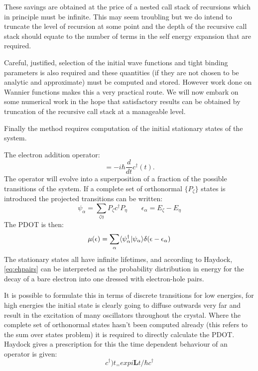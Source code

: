 These savings are obtained at the price of a nested call stack of recursions which 
in principle must be infinite. This may seem troubling but we do intend to truncate
the level of recursion at some point and the depth of the recursive call stack should
equate to the number of terms in the self energy expansion that are required.

	Careful, justified, selection of the initial wave functions and tight binding parameters
is also required and these quantities (if they are not chosen to be analytic and approximate)
must be computed and stored. However work done on Wannier functions makes this a very
practical route. We will now embark on some numerical work in the hope that satisfactory 
results can be obtained by truncation of the recursive call stack at a manageable level. 

Finally the method requires computation of the initial stationary states of the system.

The electron addition operator:
%
\begin{equation}
[H, c^{\dagger}(t)] = -i\hbar \frac{d}{dt} c^{\dagger}(t).
\end{equation}
%
The operator will evolve into a superposition of a fraction of the 
possible transitions of the system. If a complete set of orthonormal $\{P_{\zeta}\}$ 
states is introduced the projected transitions can be written:
%
\begin{equation}
\psi_{\alpha} = \sum_{\zeta\eta} P_{\zeta}c^{\dagger}P_{\eta} \qquad \epsilon_{\alpha} = E_{\zeta} - E_{\eta}
\end{equation}
%
The PDOT is then:
%
\begin{equation}
\label{eq:ehpairs}
\mu(\epsilon) = \sum_{\alpha} \langle\psi_{\alpha}^{\dagger}|\psi_{\alpha}\rangle \delta(\epsilon-\epsilon_{\alpha})
\end{equation}
%
The stationary states all have infinite lifetimes, and according to Haydock, \ref{eq:ehpairs} can
be interpreted as the probability distribution in energy for the decay of a bare electron into one dressed
with electron-hole pairs.

It is possible to formulate this in terms of discrete transitions for low energies, for high energies
the initial state is clearly going to diffuse outwards very far and result in the excitation of 
many oscillators throughout the crystal. Where the complete set of orthonormal states
hasn't been computed already (this refers to the sum over states problem) it is required to directly
calculate the PDOT. Haydock gives a prescription for this the time dependent behaviour of
an operator is given:
%
\begin{equation}
\label{eq:creationt}
c^{\dagger})t_ = exp{i\mathbf{L}t/\hbar} c^{\dagger}
\end{equation}
%

